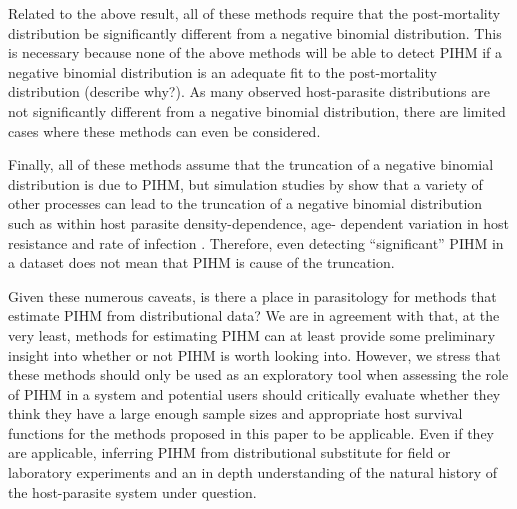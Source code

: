 \documentclass[12pt, a4paper]{article}
\begin{document}
Related to the above result, all of these methods require that the post-mortality distribution be significantly different from a negative binomial distribution.  This is necessary because none of the above methods will be able to detect PIHM if a negative binomial distribution is an adequate fit to the post-mortality distribution (describe why?).  As many observed host-parasite distributions are not significantly different from a negative binomial distribution, there are limited cases where these methods can even be considered.

Finally, all of these methods assume that the truncation of a negative binomial
distribution is due to PIHM, but simulation studies by \citep{Anderson1982a}
show that a variety of other processes can lead to the truncation of a negative
binomial distribution such as within host parasite density-dependence, age-
dependent variation in host resistance and rate of infection
\citep{McCallum2000a}.  Therefore, even detecting ``significant'' PIHM in a
dataset does not mean that PIHM is cause of the truncation.

Given these numerous caveats, is there a place in parasitology for methods that
estimate PIHM from distributional data?  We are in agreement with
\cite{Lester1984} that, at the very least, methods for estimating PIHM can at
least provide some preliminary insight into whether or not PIHM is worth
looking into.  However, we stress that these methods should only be used as an
exploratory tool when assessing the role of PIHM in a system and potential
users should critically evaluate whether they think they have a large enough
sample sizes and appropriate host survival functions for the methods proposed
in this paper to be applicable.  Even if they are applicable, inferring PIHM
from distributional substitute for field or laboratory experiments and an in
depth understanding of the natural history of the host-parasite system under
question.




\singlespacing


\end{document}
